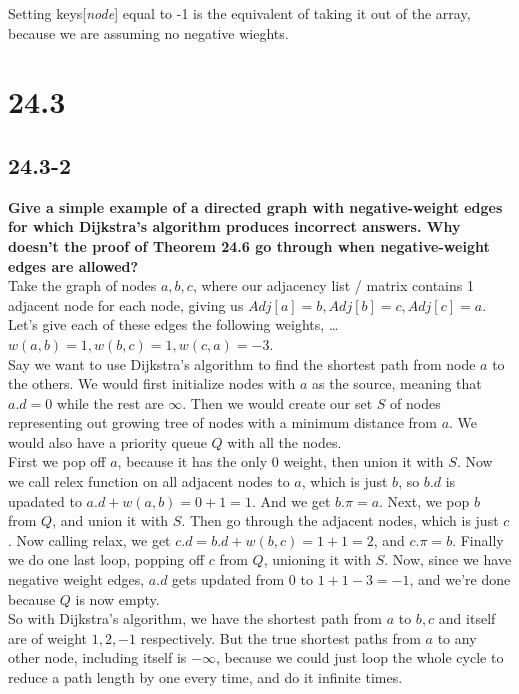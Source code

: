\documentclass[11pt]{article}
\begin{document}
Setting keys[\textit{node}] equal to -1 is the equivalent of taking it out of the array, because we 
are assuming no negative wieghts.
 \newpage

 \section*{24.3}
 \subsection*{24.3-2}
 \textbf{Give a simple example of a directed graph with negative-weight edges for which Dijkstra’s 
 algorithm produces incorrect answers. Why doesn’t the proof of Theorem 24.6 go through when 
 negative-weight edges are allowed?} \\
 
 Take the graph of nodes \(a,b,c\), where our adjacency list / matrix contains 1 adjacent node for 
 each node, giving us \(Adj[a] = b, Adj[b] = c, Adj[c] = a\).  Let's give each of these edges the 
 following weights, \dots \(w(a,b) = 1, w(b,c) = 1, w(c,a) = -3\). \\ 

 Say we want to use Dijkstra's algorithm to find the shortest path from node \(a\) to the others.
 We would first initialize nodes with \(a\) as the source, meaning that \(a.d=0\) while the rest 
 are \(\infty\).  Then we would create our set \(S\) of nodes representing out growing tree of 
 nodes with a minimum distance from \(a\).  We would also have a priority queue \(Q\) with all the 
 nodes. \\ 

 First we pop off \(a\), because it has the only 0 weight, then union it with \(S\).  Now we call 
 relex function on all adjacent nodes to \(a\), which is just \(b\), so \(b.d\) is upadated to 
 \(a.d + w(a,b) = 0 + 1 = 1\).  And we get \(b.\pi = a\).  Next, we pop \(b\) from \(Q\), and 
 union it with \(S\).  Then go through the adjacent nodes, which is just \(c\).  Now calling relax, 
 we get \(c.d = b.d + w(b,c) = 1 + 1 = 2\), and \(c.\pi = b\).  Finally we do one last loop, 
 popping off \(c\) from \(Q\), unioning it with \(S\).  Now, since we have negative weight edges, 
 \(a.d\) gets updated from 0 to \(1 + 1 - 3 = -1\), and we're done because \(Q\) is now empty. \\ 

 So with Dijkstra's algorithm, we have the shortest path from \(a\) to \(b, c\) and itself are of 
 weight \(1,2,-1\) respectively.  But the true shortest paths from \(a\) to any other node, 
 including itself is \(-\infty\), because we could just loop the whole cycle to reduce a path 
 length by one every time, and do it infinite times. \\ 
\end{document}
